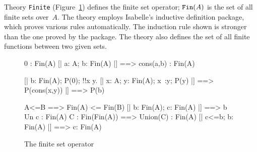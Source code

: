 Theory \texttt{Finite} (Figure~\ref{zf-fin}) defines the finite set operator;
${\tt Fin}(A)$ is the set of all finite sets over~$A$.  The theory employs
Isabelle's inductive definition package, which proves various rules
automatically.  The induction rule shown is stronger than the one proved by
the package.  The theory also defines the set of all finite functions
between two given sets.

\begin{figure}
\begin{ttbox}
      0 : Fin(A)
       [| a: A;  b: Fin(A) |] ==> cons(a,b) : Fin(A)

    [| b: Fin(A);
       P(0);
       !!x y. [| x: A;  y: Fin(A);  x~:y;  P(y) |] ==> P(cons(x,y))
    |] ==> P(b)

        A<=B ==> Fin(A) <= Fin(B)
         [| b: Fin(A);  c: Fin(A) |] ==> b Un c : Fin(A)
      C : Fin(Fin(A)) ==> Union(C) : Fin(A)
      [| c<=b;  b: Fin(A) |] ==> c: Fin(A)
\end{ttbox}
\caption{The finite set operator} \label{zf-fin}
\end{figure}

